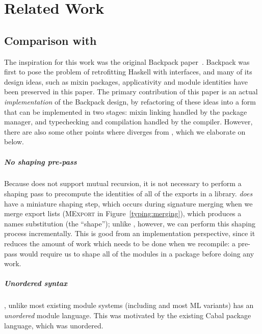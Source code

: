 \chapter{Related Work}

\section{Comparison with \OldBackpack{}}

The inspiration for this
work was the original Backpack paper~\cite{backpack}.  Backpack was
first to pose the problem of retrofitting Haskell with interfaces, and
many of its design ideas, such as mixin packages, applicativity and
module identities have been preserved in this paper.  The primary contribution
of this paper is an actual \emph{implementation} of the
Backpack design, by refactoring of these ideas into a form that can be
implemented in two stages: mixin linking handled by the package manager,
and typechecking and compilation handled by the compiler.  However,
there are also some other points where \Backpack{} diverges from
\OldBackpack{}, which we elaborate on below.

\paragraph{No shaping pre-pass}

Because \Backpack{} does not support mutual recursion, it is not
necessary to perform a shaping pass to precompute the identities of all
of the exports in a library.  \Backpack{} \emph{does} have a miniature
shaping step, which occurs during signature merging when we merge export
lists (\textsc{MExport} in Figure~\ref{typing:merging}), which
produces a names substitution (the ``shape''); unlike \OldBackpack{},
however, we can perform this
shaping process incrementally.  This is good from an implementation
perspective, since it reduces the amount of work which needs to be done
when we recompile: a pre-pass would require us to shape all of the modules
in a package before doing any work.

\paragraph{Unordered syntax}

\Backpack{}, unlike most existing module systems (including \OldBackpack{}
and most ML variants) has an \emph{unordered} module language.  This was
motivated by the existing Cabal package language, which was unordered.

